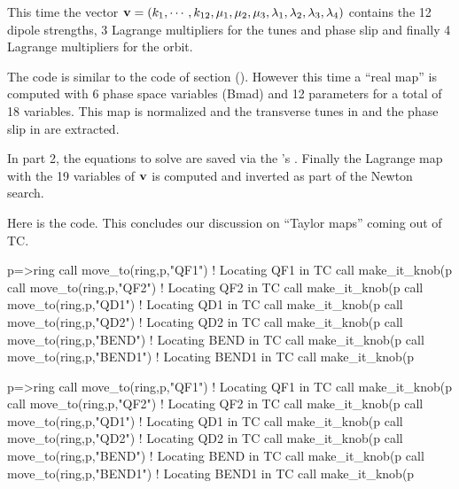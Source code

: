 \documentclass{hitec}     %
\begin{document}
{{{{{{This time the  vector ${\bf v}=(k_1,\cdots ,k_{12},{\mu }_{1},{\mu }_{2},{\mu }_{3},{\lambda }_{1},{\lambda }_{2},{\lambda }_{3},{\lambda }_{4})$ contains the 12 dipole strengths,  3 Lagrange multipliers for the tunes and phase slip and finally 4 Lagrange multipliers for the orbit.  

The code  is similar to the code of section (). However this time a ``real map'' is computed  with 6 phase space variables (Bmad) and 12 parameters for a total of 18 variables. This map is normalized and the transverse tunes in  and the phase slip in  are extracted.

In part 2, the equations to solve are saved via the 's . Finally the Lagrange map with the 19 variables of ${\bf v}$ is computed and inverted as part of the Newton search.

Here is the code. This concludes our discussion on ``Taylor maps'' coming out of TC.

\renewcommand{\codefont}{\scriptsize}
\begin{code}
p=>ring%
call move_to(ring,p,"QF1")   !  Locating QF1 in TC
call make_it_knob(p%
call move_to(ring,p,"QF2")   ! Locating QF2 in TC
call make_it_knob(p%
call move_to(ring,p,"QD1")     !  Locating QD1 in TC
call make_it_knob(p%
call move_to(ring,p,"QD2")     !  Locating QD2 in TC
call make_it_knob(p%
call move_to(ring,p,"BEND")     !  Locating BEND in TC
call make_it_knob(p%
call move_to(ring,p,"BEND1")    !  Locating BEND1 in TC
call make_it_knob(p%

p=>ring%
call move_to(ring,p,"QF1")   !  Locating QF1 in TC
call make_it_knob(p%
call move_to(ring,p,"QF2")   ! Locating QF2 in TC
call make_it_knob(p%
call move_to(ring,p,"QD1")     !  Locating QD1 in TC
call make_it_knob(p%
call move_to(ring,p,"QD2")     !  Locating QD2 in TC
call make_it_knob(p%
call move_to(ring,p,"BEND")     !  Locating BEND in TC
call make_it_knob(p%
call move_to(ring,p,"BEND1")    !  Locating BEND1 in TC
call make_it_knob(p%



\end{code}}}}}}}
\end{document}
